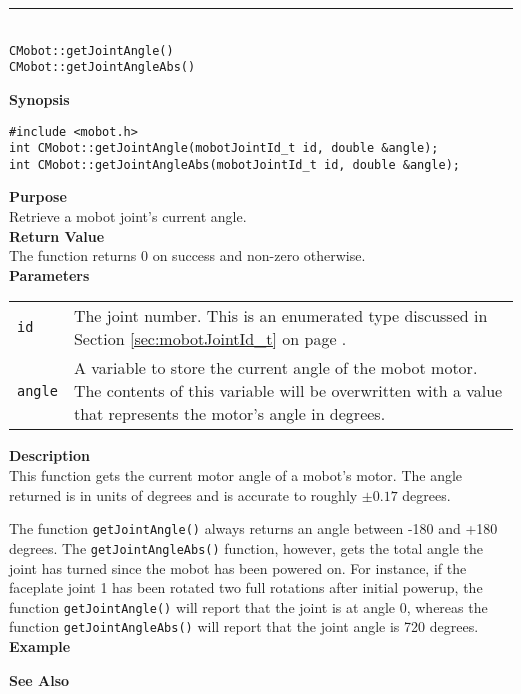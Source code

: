 \noindent
\vspace{5pt}
\rule{4.5in}{0.015in}\\
\noindent
{\LARGE \texttt{CMobot::getJointAngle()}}\\
{\LARGE \texttt{CMobot::getJointAngleAbs()}}\\
{}

\noindent
{\bf Synopsis}
\vspace{-8pt}
\begin{verbatim}
#include <mobot.h>
int CMobot::getJointAngle(mobotJointId_t id, double &angle);
int CMobot::getJointAngleAbs(mobotJointId_t id, double &angle);
\end{verbatim}

\noindent
{\bf Purpose}\\
Retrieve a mobot joint's current angle.\\

\noindent
{\bf Return Value}\\
The function returns 0 on success and non-zero otherwise.\\

\noindent
{\bf Parameters}\\
\vspace{-0.1in}
\begin{description}
\item               
\begin{tabular}{p{15 mm}p{145 mm}}
\texttt{id} & The joint number. This is an enumerated type 
discussed in Section \ref{sec:mobotJointId_t} on page
\pageref{sec:mobotJointId_t}.\\
\texttt{angle} & A variable to store the current angle of the mobot
motor. The contents of this variable will be overwritten with a value that
represents the motor's angle in degrees.  \\
\end{tabular}
\end{description}

\noindent
{\bf Description}\\
This function gets the current motor angle of a mobot's motor. The
angle returned is in units of degrees and is accurate to roughly $\pm0.17$
degrees. 

The function \texttt{getJointAngle()} always returns an angle between -180 and
+180 degrees. The \texttt{getJointAngleAbs()} function, however, gets the total
angle the joint has turned since the mobot has been powered on. For instance, 
if the faceplate joint 1 has been rotated two full rotations after initial powerup,
  the function \texttt{getJointAngle()} will report that the joint is at angle 0,
  whereas the function \texttt{getJointAngleAbs()} will report that the joint
  angle is 720 degrees.
\\

\noindent
{\bf Example}\\
\noindent

\noindent
{\bf See Also}\\


